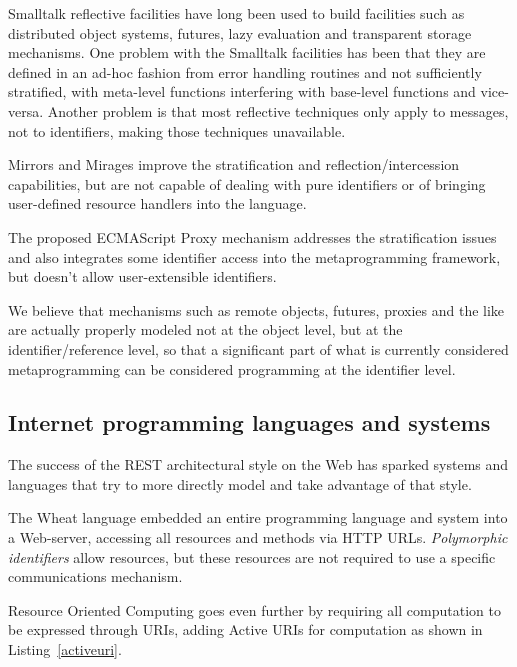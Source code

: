 \documentclass[preprint,authoryear]{acm_proc_article-sp}
\begin{document}
Smalltalk reflective facilities \cite{reflective-st} have long been used to build
facilities such as distributed object systems, futures, lazy evaluation and
transparent storage mechanisms.  One problem with the Smalltalk facilities
has been that they are defined in an ad-hoc fashion from error handling routines
and not sufficiently stratified, with meta-level functions
interfering with base-level functions and vice-versa.  Another problem is that
most reflective techniques only apply to messages, not to identifiers, making 
those techniques unavailable.

Mirrors \cite{mirrors} and Mirages \cite{mirages} improve the stratification and
reflection/intercession capabilities, but are not capable of dealing with pure
identifiers or of bringing user-defined resource handlers into the language.

The proposed ECMAScript Proxy mechanism \cite{VanCutsemMiller} addresses
the stratification issues and also integrates some identifier access into the 
metaprogramming framework, but doesn't allow user-extensible identifiers.

We believe that mechanisms such as remote objects, futures, proxies and the like
are actually properly modeled not at the object level, but at the identifier/reference
level, so that a significant part of what is currently considered metaprogramming
can be considered programming at the identifier level.

\subsection{Internet programming languages and systems}

The success of the REST architectural style\cite{fielding-rest} on the Web has sparked
systems and languages that try to more directly model and take advantage of that
style.

The Wheat language \cite{wheat} embedded an entire programming language
and system into a Web-server, accessing all resources and methods via
HTTP URLs.  \emph{Polymorphic identifiers} allow resources, but these resources
are not required to use a specific communications mechanism.


Resource Oriented Computing \cite{roc} goes even further by
requiring all computation to be expressed through URIs, adding Active URIs
for computation as shown in Listing~\ref{activeuri}.   


\end{document}

